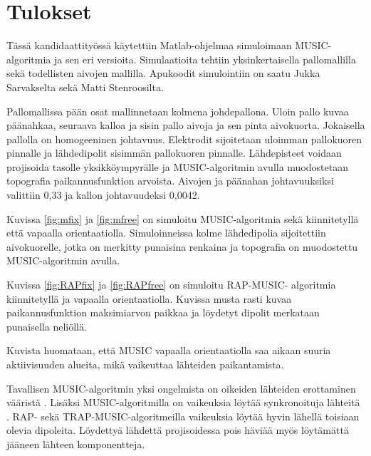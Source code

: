 \section{Tulokset}
Tässä kandidaattityössä käytettiin Matlab-ohjelmaa simuloimaan MUSIC-algoritmia ja sen eri versioita. Simulaatioita tehtiin yksinkertaisella pallomallilla sekä todellisten aivojen mallilla. Apukoodit simulointiin on saatu Jukka Sarvakselta sekä Matti Stenroosilta.

Pallomallissa pään osat mallinnetaan kolmena johdepallona. Uloin pallo kuvaa päänahkaa, seuraava kalloa ja sisin pallo aivoja ja sen pinta aivokuorta. Jokaisella pallolla on homogeeninen johtavuus. 
Elektrodit sijoitetaan uloimman pallokuoren pinnalle ja lähdedipolit sisimmän pallokuoren pinnalle. Lähdepisteet voidaan projisoida tasolle yksikköympyrälle ja MUSIC-algoritmin avulla muodostetaan topografia paikannusfunktion arvoista. Aivojen ja päänahan johtavuuksiksi valittiin 0,33 ja kallon johtavuudeksi 0,0042.

Kuvissa \ref{fig:mfix} ja \ref{fig:mfree} on simuloitu MUSIC-algoritmia sekä kiinnitetyllä että vapaalla orientaatiolla. Simuloinneissa kolme lähdedipolia sijoitettiin aivokuorelle, jotka on merkitty punaisina renkaina ja topografia on muodostettu MUSIC-algoritmin avulla.

Kuvissa \ref{fig:RAPfix} ja \ref{fig:RAPfree} on simuloitu RAP-MUSIC- algoritmia kiinnitetyllä ja vapaalla orientaatiolla. Kuvissa musta rasti kuvaa paikannusfunktion maksimiarvon paikkaa ja löydetyt dipolit merkataan punaisella neliöllä.

Kuvista huomataan, että MUSIC vapaalla orientaatiolla saa aikaan suuria aktiivisuuden alueita, mikä vaikeuttaa lähteiden paikantamista.

Tavallisen MUSIC-algoritmin yksi ongelmista on oikeiden lähteiden erottaminen vääristä \citep{Mosher1998RecursiveLocalization}. Lisäksi MUSIC-algoritmilla on vaikeuksia löytää synkronoituja lähteitä \citep{Mosher1999SourceMUSIC}. RAP- sekä TRAP-MUSIC-algoritmeilla vaikeuksia löytää hyvin lähellä toisiaan olevia dipoleita. Löydettyä lähdettä projisoidessa pois häviää myös löytämättä jääneen lähteen komponentteja.

